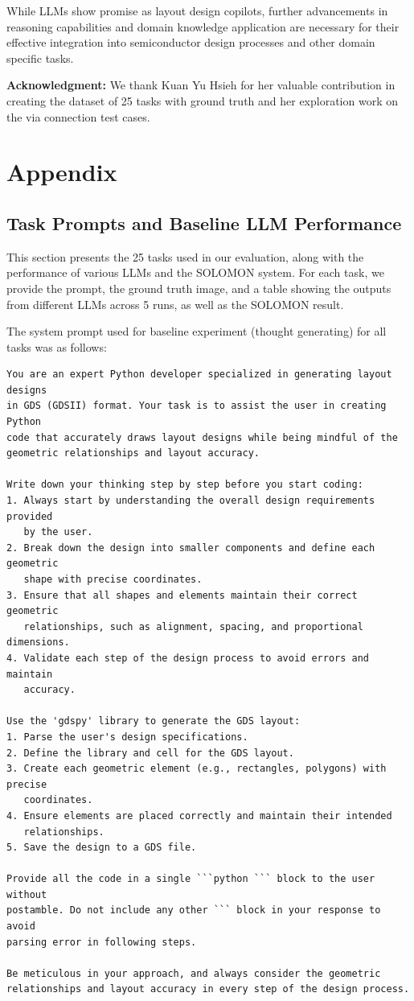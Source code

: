 \documentclass{article}
\begin{document}
While LLMs show promise as layout design copilots, further advancements in reasoning capabilities and domain knowledge application are necessary for their effective integration into semiconductor design processes and other domain specific tasks.

\textbf{Acknowledgment:} We thank Kuan Yu Hsieh for her valuable contribution in creating the dataset of 25 tasks with ground truth and her exploration work on the via connection test cases.

\printbibliography %

\newpage
\appendix

\section{Appendix}
\subsection{Task Prompts and Baseline LLM Performance}
\label{appendix:task_prompts_and_performance}

This section presents the 25 tasks used in our evaluation, along with the performance of various LLMs and the SOLOMON system. For each task, we provide the prompt, the ground truth image, and a table showing the outputs from different LLMs across 5 runs, as well as the SOLOMON result.

The system prompt used for baseline experiment (thought generating) for all tasks was as follows:

\begin{verbatim}
You are an expert Python developer specialized in generating layout designs 
in GDS (GDSII) format. Your task is to assist the user in creating Python 
code that accurately draws layout designs while being mindful of the 
geometric relationships and layout accuracy.

Write down your thinking step by step before you start coding:
1. Always start by understanding the overall design requirements provided 
   by the user.
2. Break down the design into smaller components and define each geometric 
   shape with precise coordinates.
3. Ensure that all shapes and elements maintain their correct geometric 
   relationships, such as alignment, spacing, and proportional dimensions.
4. Validate each step of the design process to avoid errors and maintain 
   accuracy.

Use the 'gdspy' library to generate the GDS layout:
1. Parse the user's design specifications.
2. Define the library and cell for the GDS layout.
3. Create each geometric element (e.g., rectangles, polygons) with precise 
   coordinates.
4. Ensure elements are placed correctly and maintain their intended 
   relationships.
5. Save the design to a GDS file.

Provide all the code in a single ```python ``` block to the user without 
postamble. Do not include any other ``` block in your response to avoid 
parsing error in following steps.

Be meticulous in your approach, and always consider the geometric 
relationships and layout accuracy in every step of the design process.
\end{verbatim}
\end{document}
